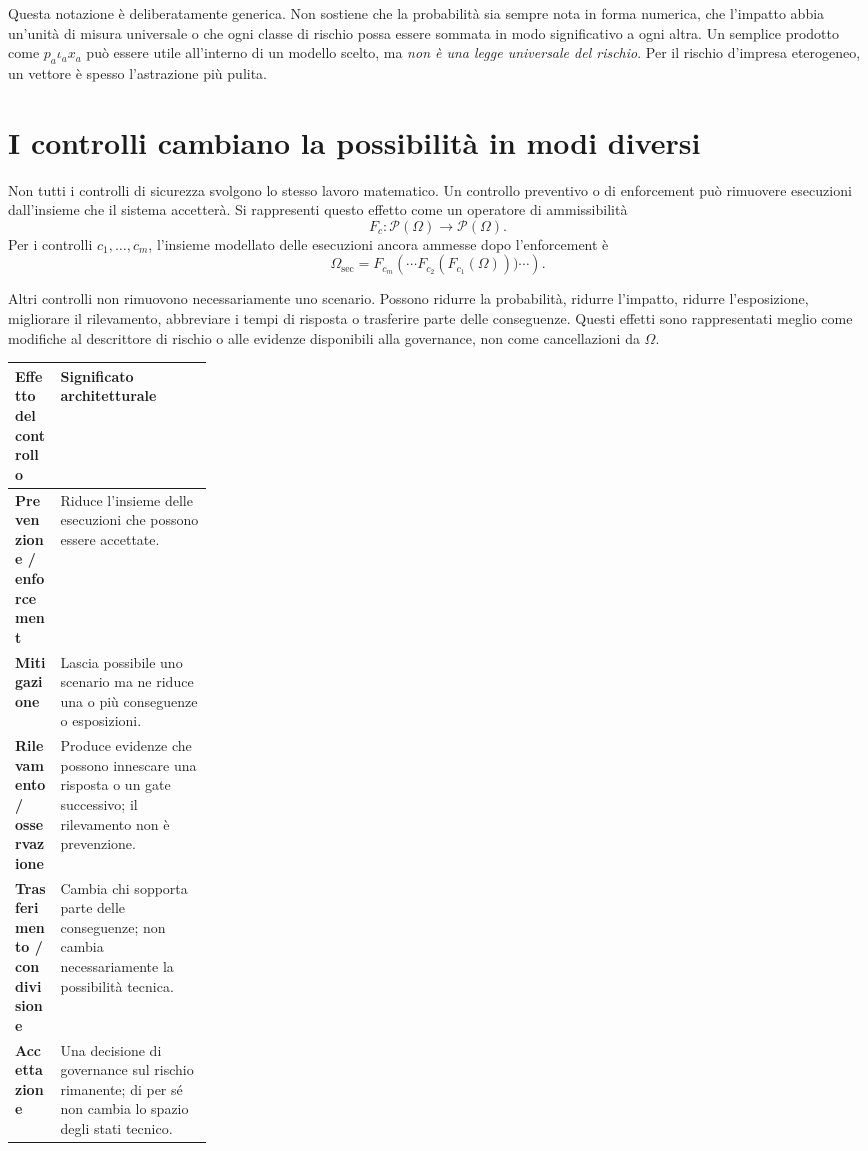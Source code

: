 \documentclass[10pt,oneside,openany]{book}
\begin{document}
Questa notazione è deliberatamente generica. Non sostiene che la probabilità sia sempre nota in forma numerica, che l'impatto abbia un'unità di misura universale o che ogni classe di rischio possa essere sommata in modo significativo a ogni altra. Un semplice prodotto come $p_a\iota_a x_a$ può essere utile all'interno di un modello scelto, ma \emph{non è una legge universale del rischio}. Per il rischio d'impresa eterogeneo, un vettore è spesso l'astrazione più pulita.

\section{I controlli cambiano la possibilità in modi diversi}

Non tutti i controlli di sicurezza svolgono lo stesso lavoro matematico. Un controllo preventivo o di enforcement può rimuovere esecuzioni dall'insieme che il sistema accetterà. Si rappresenti questo effetto come un operatore di ammissibilità
\[
F_c:\mathcal{P}(\Omega)\rightarrow\mathcal{P}(\Omega).
\]
Per i controlli $c_1,\ldots,c_m$, l'insieme modellato delle esecuzioni ancora ammesse dopo l'enforcement è
\[
\Omega_{\mathrm{sec}}=F_{c_m}\!\left(\cdots F_{c_2}(F_{c_1}(\Omega)))\cdots\right).
\]

Altri controlli non rimuovono necessariamente uno scenario. Possono ridurre la probabilità, ridurre l'impatto, ridurre l'esposizione, migliorare il rilevamento, abbreviare i tempi di risposta o trasferire parte delle conseguenze. Questi effetti sono rappresentati meglio come modifiche al descrittore di rischio o alle evidenze disponibili alla governance, non come cancellazioni da $\Omega$.

\begin{center}
\small
\begin{tabularx}{0.95\linewidth}{>{\bfseries}p{0.23\linewidth} Y}
\toprule
Effetto del controllo & Significato architetturale \\
\midrule
Prevenzione / enforcement & Riduce l'insieme delle esecuzioni che possono essere accettate. \\
Mitigazione & Lascia possibile uno scenario ma ne riduce una o più conseguenze o esposizioni. \\
Rilevamento / osservazione & Produce evidenze che possono innescare una risposta o un gate successivo; il rilevamento non è prevenzione. \\
Trasferimento / condivisione & Cambia chi sopporta parte delle conseguenze; non cambia necessariamente la possibilità tecnica. \\
Accettazione & Una decisione di governance sul rischio rimanente; di per sé non cambia lo spazio degli stati tecnico. \\
\bottomrule
\end{tabularx}
\end{center}
\end{document}
